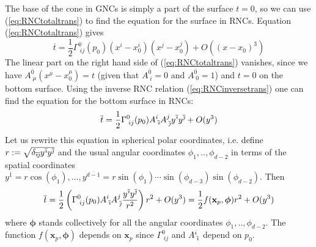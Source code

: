 \documentclass[12pt]{article}
\newcommand{\be}{\begin{equation}}
\newcommand{\ee}{\end{equation}}
\newcommand{\ibar}{{\overline{\emph\i}}}
\newcommand{\jbar}{{\overline{\emph\j}}}
\begin{document}
The base of the cone in GNCs is simply a part of the surface $t=0$, so we can use (\ref{eq:RNCtotaltrans}) to find the equation for the surface in RNCs. Equation (\ref{eq:RNCtotaltrans}) gives
\be\label{eq:BottomSurfaceWithGNC}
\overline{t}=\frac{1}{2}\Gamma^{0}_{\;ij} (p_0)(x^i-x_0^i) (x^j-x_0^j)+O ( (x-x_0)^3)
\ee
The linear part on the right hand side of (\ref{eq:RNCtotaltrans}) vanishes, since we have $A^{\overline{0}}_{\;\mu}(x^{\mu}-x_0^{\mu})=t$ (given that $A^{\overline{0}}_{\;i}=0$ and $A^{\overline{0}}_{\;0}=1$) and $t=0$ on the bottom surface. Using the inverse RNC relation (\ref{eq:RNCinversetrans}) one can find the equation for the bottom surface in RNCs:
\be\label{eq:BottomSurface}
\overline{t}=\frac{1}{2}\Gamma^{0}_{\;ij} (p_0)A^{i}_{\;\ibar}A^{j}_{\;\jbar}y^{\ibar} y^{\jbar}+O (y^3)
\ee
Let us rewrite this equation in spherical polar coordinates, i.e. define $r:=\sqrt{\delta_{\ibar\jbar}y^\ibar y^\jbar}$ and the usual angular coordinates $\phi_1,..,\phi_{d-2}$ in terms of the spatial coordinates $y^{\overline{1}} = r \cos (\phi_1),\ldots, y^{\overline{d-1}} = r \sin (\phi_1) \cdots \sin (\phi_{d-3}) \sin (\phi_{d-2})$. Then
\be\label{eq:RadialBottomSurface}
\overline{t}=\frac{1}{2}\left (\Gamma^{0}_{\;ij} (p_0)A^{i}_{\;\ibar}A^{j}_{\;\jbar}\frac{y^{\ibar} y^{\jbar}}{r^2}\right)r^2+O (y^3)=\frac{1}{2}f (\mathbf{x}_p,{\boldsymbol\phi})r^2+O (y^3)
\ee
where $\boldsymbol\phi$ stands collectively for all the angular coordinates $\phi_1,..,\phi_{d-2}$. The function $f (\mathbf{x}_p,\boldsymbol\phi)$ depends on $\mathbf{x}_p$ since $\Gamma^{0}_{\;ij}$ and $A^{i}_{\;\ibar}$ depend on $p_0$.
\end{document}
